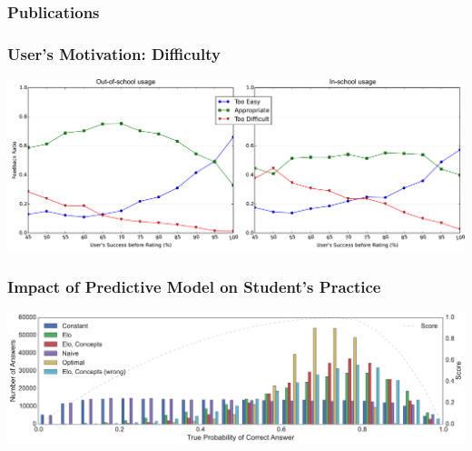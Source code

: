 \documentclass[xcolor=svgnames]{beamer}
\begin{document}
\begin{frame}
	\frametitle{Publications}
	
	\nocite{*}
	
\end{frame}
\begin{frame}
	\frametitle{User's Motivation: Difficulty}
	\begin{center}
		\includegraphics[width=\textwidth]{feedback}
	\end{center}
\end{frame}
\begin{frame}
	\frametitle{Impact of Predictive Model on Student's Practice}
	\begin{center}
		\includegraphics[width=\textwidth]{number_of_answers}
	\end{center}
\end{frame}
\end{document}
